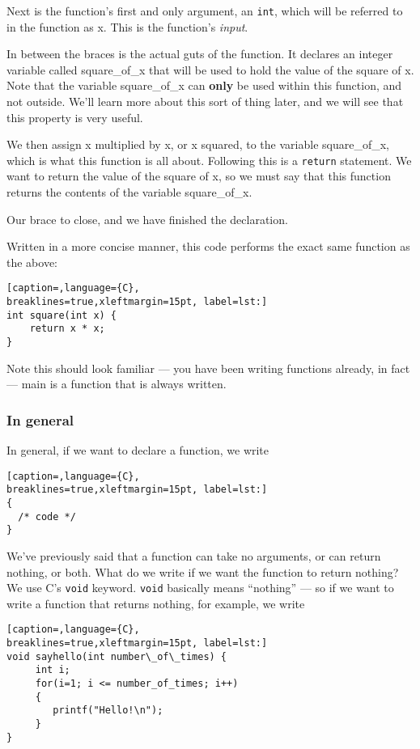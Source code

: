 Next is the function's first and only argument, an \texttt{int}, which will be
referred to in the function as x. This is the function's \emph{input}. 

In between the braces is the actual guts of the function. It declares an
integer variable called square\_of\_x that will be used to hold the value of
the square of x. Note that the variable square\_of\_x can \textbf{only} be used
within this function, and not outside. We'll learn more about this sort of
thing later, and we will see that this property is very useful. 

We then assign x multiplied by x, or x squared, to the variable square\_of\_x,
which is what this function is all about. Following this is a \texttt{return}
statement. We want to return the value of the square of x, so we must say that
this function returns the contents of the variable square\_of\_x.

Our brace to close, and we have finished the declaration.

Written in a more concise manner, this code performs the exact same function as
the above:

\lstset{basicstyle=\scriptsize, numbers=left, captionpos=b, tabsize=4}
\begin{lstlisting}[caption=,language={C},
breaklines=true,xleftmargin=15pt, label=lst:]
int square(int x) {
	return x * x;
}
\end{lstlisting}

Note this should look familiar --- you have been writing functions already, in
fact --- main is a function that is always written.

\subsubsection{In general}
In general, if we want to declare a function, we write
\lstset{basicstyle=\scriptsize, numbers=left, captionpos=b, tabsize=4}
\begin{lstlisting}[caption=,language={C},
breaklines=true,xleftmargin=15pt, label=lst:]
{
  /* code */
} 
\end{lstlisting}

We've previously said that a function can take no arguments, or can return
nothing, or both. What do we write if we want the function to return nothing?
We use C's \texttt{void} keyword. \texttt{void} basically means ``nothing'' ---
so if we want to write a function that returns nothing, for example, we write

\lstset{basicstyle=\scriptsize, numbers=left, captionpos=b, tabsize=4}
\begin{lstlisting}[caption=,language={C},
breaklines=true,xleftmargin=15pt, label=lst:]
void sayhello(int number\_of\_times) {
	 int i;
	 for(i=1; i <= number_of_times; i++)
	 {
	    printf("Hello!\n");
	 }
}
\end{lstlisting}

